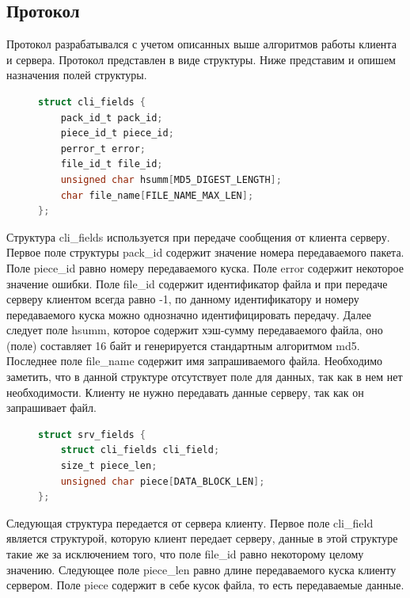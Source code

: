 \subsection{Протокол}
Протокол разрабатывался с учетом описанных выше алгоритмов работы
клиента и сервера. Протокол представлен в виде структуры. Ниже
представим и опишем назначения полей структуры.
\begin{figure}
    \begin{lstlisting}[language=C]
struct cli_fields {
    pack_id_t pack_id;
    piece_id_t piece_id;
    perror_t error;
    file_id_t file_id;
    unsigned char hsumm[MD5_DIGEST_LENGTH];
    char file_name[FILE_NAME_MAX_LEN];
};
    \end{lstlisting}
\end{figure}
\newpar
Структура cli\_fields используется при передаче сообщения от клиента
серверу. Первое поле структуры pack\_id содержит значение номера
передаваемого пакета. Поле piece\_id равно номеру передаваемого куска. Поле
error содержит некоторое значение ошибки. Поле file\_id содержит
идентификатор файла и при передаче серверу клиентом всегда равно -1, по
данному идентификатору и номеру передаваемого куска можно однозначно
идентифицировать передачу. Далее следует поле hsumm, которое содержит
хэш-сумму передаваемого файла, оно (поле) составляет 16 байт и
генерируется стандартным алгоритмом md5. Последнее поле file\_name
содержит имя запрашиваемого файла. Необходимо заметить, что в данной
структуре отсутствует поле для данных, так как в нем нет необходимости.
Клиенту не нужно передавать данные серверу, так как он запрашивает файл.
\begin{figure}[h!]
    \begin{lstlisting}[language=C]
struct srv_fields {
    struct cli_fields cli_field;
    size_t piece_len;
    unsigned char piece[DATA_BLOCK_LEN];
};
    \end{lstlisting}
\end{figure}
\newpar
Следующая структура передается от сервера клиенту. Первое поле cli\_field
является структурой, которую клиент передает серверу, данные в этой
структуре такие же за исключением того, что поле file\_id равно некоторому
целому значению. Следующее поле piece\_len равно длине передаваемого
куска клиенту сервером. Поле piece содержит в себе кусок файла, то есть
передаваемые данные.

